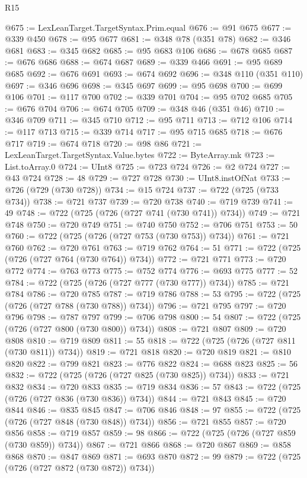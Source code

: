 \begin{lexlean}{R15}
\begin{coremodule}
{{{{{{{{{{{{{{{{{{{{{{{{{{{{{{{{{{{{{{{{{{{{{{{{{{{{{{{{{{{{{{{{{{{{{{@675 := LexLeanTarget.TargetSyntax.Prim.equal
@676 := @91 @675
@677 := @339 @450
@678 := @95 @677
@681 := @348 @78 (@351 @78)
@682 := @346 @681
@683 := @345 @682
@685 := @95 @683 @106
@686 := @678 @685
@687 := @676 @686
@688 := @674 @687
@689 := @339 @466
@691 := @95 @689 @685
@692 := @676 @691
@693 := @674 @692
@696 := @348 @110 (@351 @110)
@697 := @346 @696
@698 := @345 @697
@699 := @95 @698
@700 := @699 @106
@701 := @117 @700
@702 := @339 @701
@704 := @95 @702 @685
@705 := @676 @704
@706 := @674 @705
@709 := @348 @46 (@351 @46)
@710 := @346 @709
@711 := @345 @710
@712 := @95 @711
@713 := @712 @106
@714 := @117 @713
@715 := @339 @714
@717 := @95 @715 @685
@718 := @676 @717
@719 := @674 @718
@720 := @98 @86
@721 := LexLeanTarget.TargetSyntax.Value.bytes
@722 := ByteArray.mk
@723 := List.toArray.{0}
@724 := UInt8
@725 := @723 @724
@726 := @2 @724
@727 := @43 @724
@728 := 48
@729 := @727 @728
@730 := UInt8.instOfNat
@733 := @726 (@729 (@730 @728))
@734 := @15 @724
@737 := @722 (@725 (@733 @734))
@738 := @721 @737
@739 := @720 @738
@740 := @719 @739
@741 := 49
@748 := @722 (@725 (@726 (@727 @741 (@730 @741)) @734))
@749 := @721 @748
@750 := @720 @749
@751 := @740 @750
@752 := @706 @751
@753 := 50
@760 := @722 (@725 (@726 (@727 @753 (@730 @753)) @734))
@761 := @721 @760
@762 := @720 @761
@763 := @719 @762
@764 := 51
@771 := @722 (@725 (@726 (@727 @764 (@730 @764)) @734))
@772 := @721 @771
@773 := @720 @772
@774 := @763 @773
@775 := @752 @774
@776 := @693 @775
@777 := 52
@784 := @722 (@725 (@726 (@727 @777 (@730 @777)) @734))
@785 := @721 @784
@786 := @720 @785
@787 := @719 @786
@788 := 53
@795 := @722 (@725 (@726 (@727 @788 (@730 @788)) @734))
@796 := @721 @795
@797 := @720 @796
@798 := @787 @797
@799 := @706 @798
@800 := 54
@807 := @722 (@725 (@726 (@727 @800 (@730 @800)) @734))
@808 := @721 @807
@809 := @720 @808
@810 := @719 @809
@811 := 55
@818 := @722 (@725 (@726 (@727 @811 (@730 @811)) @734))
@819 := @721 @818
@820 := @720 @819
@821 := @810 @820
@822 := @799 @821
@823 := @776 @822
@824 := @688 @823
@825 := 56
@832 := @722 (@725 (@726 (@727 @825 (@730 @825)) @734))
@833 := @721 @832
@834 := @720 @833
@835 := @719 @834
@836 := 57
@843 := @722 (@725 (@726 (@727 @836 (@730 @836)) @734))
@844 := @721 @843
@845 := @720 @844
@846 := @835 @845
@847 := @706 @846
@848 := 97
@855 := @722 (@725 (@726 (@727 @848 (@730 @848)) @734))
@856 := @721 @855
@857 := @720 @856
@858 := @719 @857
@859 := 98
@866 := @722 (@725 (@726 (@727 @859 (@730 @859)) @734))
@867 := @721 @866
@868 := @720 @867
@869 := @858 @868
@870 := @847 @869
@871 := @693 @870
@872 := 99
@879 := @722 (@725 (@726 (@727 @872 (@730 @872)) @734))
}}}}}}}}}}}}}}}}}}}}}}}}}}}}}}}}}}}}}}}}}}}}}}}}}}}}}}}}}}}}}}}}}}}}}}
\end{coremodule}
\end{lexlean}
